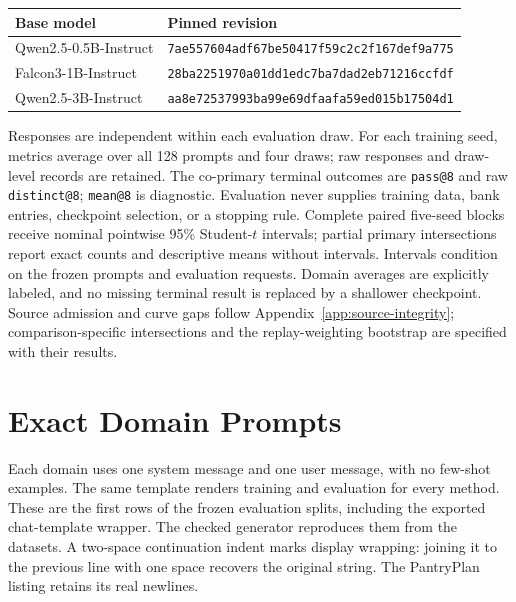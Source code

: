 \documentclass{article}
\newcommand{\1}{\mathbf 1}
\theoremstyle{remark}
\theoremstyle{definition}
\theoremstyle{plain}
\begin{document}
\begin{center}
\small
\begin{tabular}{@{}ll@{}}
\toprule
\textbf{Base model} & \textbf{Pinned revision} \\
\midrule
Qwen2.5-0.5B-Instruct & {\scriptsize\texttt{7ae557604adf67be50417f59c2c2f167def9a775}} \\
Falcon3-1B-Instruct & {\scriptsize\texttt{28ba2251970a01dd1edc7ba7dad2eb71216ccfdf}} \\
Qwen2.5-3B-Instruct & {\scriptsize\texttt{aa8e72537993ba99e69dfaafa59ed015b17504d1}} \\
\bottomrule
\end{tabular}
\end{center}

Responses are independent within each evaluation draw. For each training
seed, metrics average over all 128 prompts and four draws; raw responses
and draw-level records are retained. The co-primary terminal outcomes are
\texttt{pass@8} and raw \texttt{distinct@8}; \texttt{mean@8} is diagnostic.
Evaluation never supplies training data, bank entries, checkpoint selection,
or a stopping rule. Complete paired five-seed blocks receive nominal
pointwise 95\% Student-$t$ intervals; partial primary intersections report
exact counts and descriptive means without intervals. Intervals condition
on the frozen prompts and evaluation requests. Domain averages are
explicitly labeled, and no missing terminal result is replaced by a
shallower checkpoint. Source admission and curve gaps follow
Appendix~\ref{app:source-integrity}; comparison-specific intersections and
the replay-weighting bootstrap are specified with their results.

\section{Exact Domain Prompts}
\label{app:prompts}

Each domain uses one system message and one user message, with no few-shot
examples. The same template renders training and evaluation for every
method. These are the first rows of the frozen evaluation splits, including
the exported chat-template wrapper. The checked generator
 reproduces them from the datasets.
A two-space continuation indent marks display wrapping: joining it to the
previous line with one space recovers the original string. The PantryPlan
listing retains its real newlines.

\end{document}
